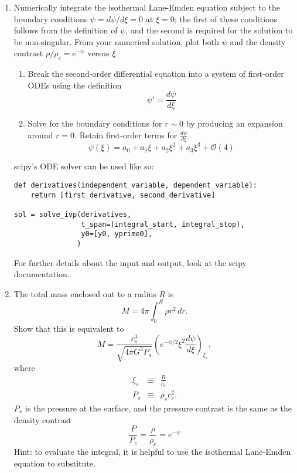 \documentclass{article}
\begin{document}
\begin{enumerate}
\item Numerically integrate the isothermal Lane-Emden equation subject to the
    boundary conditions $\psi=d\psi/d\xi = 0$ at $\xi=0$; the first of these
    conditions follows from the definition of $\psi$, and the second is
    required for the solution to be non-singular. From your numerical solution,
    plot both $\psi$ and the density contrast $\rho/\rho_c = e^{-\psi}$ versus
    $\xi$.

    \begin{enumerate}
        \item Break the second-order differential equation into a system of first-order ODEs using the definition
    $$ \psi ' = \frac{d\psi}{d\xi} $$
        \item Solve for the boundary conditions for $r\sim0$ by producing an expansion around $r=0$.
            Retain first-order terms for $\frac{d \psi}{d\xi}$.
            $$ \psi(\xi) = a_0 + a_1 \xi + a_2 \xi^2 + a_3 \xi^3 + \mathcal{O}(4)$$
    \end{enumerate}

    scipy's ODE solver can be used like so:
\begin{verbatim}
def derivatives(independent_variable, dependent_variable):
    return [first_derivative, second_derivative]

sol = solve_ivp(derivatives,
                t_span=(integral_start, integral_stop),
                y0=[y0, yprime0],
               )
\end{verbatim}

For further details about the input and output, look at the scipy documentation.



\item The total mass enclosed out to a radius $R$ is
\begin{displaymath}
M = 4\pi \int_0^R \rho r^2 \, dr.
\end{displaymath}
Show that this is equivalent to
\begin{displaymath}
M =\frac{c_s^4}{\sqrt{4\pi G^3 P_s}} \left(e^{-\psi/2}\xi^2 \frac{d\psi}{d\xi}\right)_{\xi_s},
\end{displaymath}
where
\begin{eqnarray*}
\xi_s & \equiv & \frac{R}{r_0} \\
P_s & \equiv & \rho_s c_s^2.
\end{eqnarray*}
$P_s$ is the pressure at the surface, and the pressure contrast is the same as the density contrast $$\frac{P}{P_c} = \frac{\rho}{\rho_c} = e^{-\psi}$$
Hint: to evaluate the integral, it is helpful to use the isothermal Lane-Emden equation to substitute.



\end{enumerate}
\end{document}
